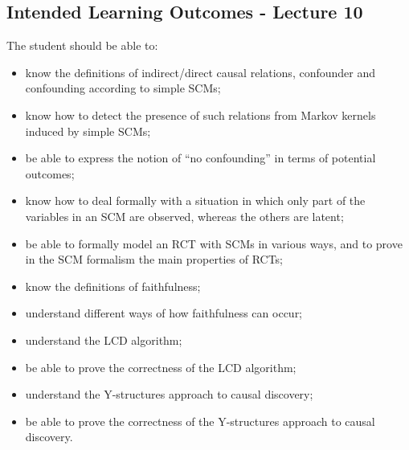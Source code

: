 \subsection*{Intended Learning Outcomes - Lecture 10}

The student should be able to:
\begin{itemize}
\item know the definitions of indirect/direct causal relations, confounder and confounding according to simple SCMs;
\item know how to detect the presence of such relations from Markov kernels induced by simple SCMs;
\item be able to express the notion of ``no confounding'' in terms of potential outcomes;
\item know how to deal formally with a situation in which only part of the variables in an SCM are observed, whereas the others are latent;
\item be able to formally model an RCT with SCMs in various ways, and to prove in the SCM formalism the main properties of RCTs;
\item know the definitions of faithfulness;
\item understand different ways of how faithfulness can occur;
\item understand the LCD algorithm;
\item be able to prove the correctness of the LCD algorithm;
\item understand the Y-structures approach to causal discovery;
\item be able to prove the correctness of the Y-structures approach to causal discovery.
\end{itemize}
